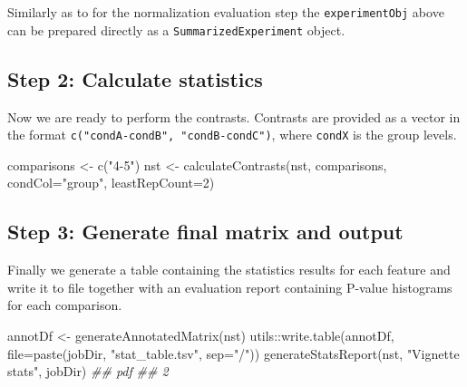 \documentclass[]{article}
\newcommand{\hlnum}[1]{\textcolor[rgb]{0.816,0.125,0.439}{#1}}%
\newcommand{\hlstr}[1]{\textcolor[rgb]{0.251,0.627,0.251}{#1}}%
\newcommand{\hlcom}[1]{\textcolor[rgb]{0.502,0.502,0.502}{\textit{#1}}}%
\newcommand{\hlstd}[1]{\textcolor[rgb]{0.251,0.251,0.251}{#1}}%
\newenvironment{Shaded}{\begin{myshaded}}{\end{myshaded}}
\newcommand{\DecValTok}[1]{\hlnum{#1}}
\newcommand{\SpecialCharTok}[1]{\hlstr{#1}}
\newcommand{\StringTok}[1]{\hlstr{#1}}
\newcommand{\DocumentationTok}[1]{\hlcom{#1}}
\newcommand{\OtherTok}[1]{{#1}}
\newcommand{\FunctionTok}[1]{\hlstd{#1}}
\newcommand{\AttributeTok}[1]{{#1}}
\newcommand{\NormalTok}[1]{\hlstd{#1}}
\begin{document}
Similarly as to for the normalization evaluation step the \texttt{experimentObj}
above can be prepared directly as a \texttt{SummarizedExperiment} object.

\hypertarget{step-2-calculate-statistics}{%
\subsection{Step 2: Calculate statistics}\label{step-2-calculate-statistics}}

Now we are ready to perform the contrasts. Contrasts are provided as a vector
in the format \texttt{c("condA-condB", "condB-condC")}, where \texttt{condX} is the group levels.

\begin{Shaded}
\begin{Highlighting}[]
\NormalTok{comparisons }\OtherTok{\textless{}{-}} \FunctionTok{c}\NormalTok{(}\StringTok{"4{-}5"}\NormalTok{)}
\NormalTok{nst }\OtherTok{\textless{}{-}} \FunctionTok{calculateContrasts}\NormalTok{(nst, comparisons, }\AttributeTok{condCol=}\StringTok{"group"}\NormalTok{, }\AttributeTok{leastRepCount=}\DecValTok{2}\NormalTok{)}
\end{Highlighting}
\end{Shaded}

\hypertarget{step-3-generate-final-matrix-and-output}{%
\subsection{Step 3: Generate final matrix and output}\label{step-3-generate-final-matrix-and-output}}

Finally we generate a table containing the statistics results for each feature
and write it to file together with an evaluation report containing P-value histograms
for each comparison.

\begin{Shaded}
\begin{Highlighting}[]
\NormalTok{annotDf }\OtherTok{\textless{}{-}} \FunctionTok{generateAnnotatedMatrix}\NormalTok{(nst)}
\NormalTok{utils}\SpecialCharTok{::}\FunctionTok{write.table}\NormalTok{(annotDf, }\AttributeTok{file=}\FunctionTok{paste}\NormalTok{(jobDir, }\StringTok{"stat\_table.tsv"}\NormalTok{, }\AttributeTok{sep=}\StringTok{"/"}\NormalTok{))}
\FunctionTok{generateStatsReport}\NormalTok{(nst, }\StringTok{"Vignette stats"}\NormalTok{, jobDir)}
\DocumentationTok{\#\# pdf }
\DocumentationTok{\#\#   2}
\end{Highlighting}
\end{Shaded}
\end{document}
